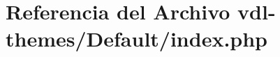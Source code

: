 \hypertarget{vdl-themes_2Default_2index_8php}{\section{Referencia del Archivo vdl-\/themes/\-Default/index.php}
\label{vdl-themes_2Default_2index_8php}
}
